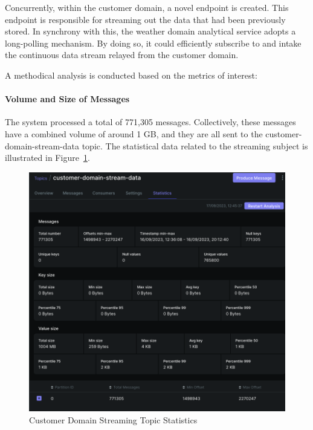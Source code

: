 \documentclass{ieeeaccess}
\begin{document}
Concurrently, within the customer domain, a novel endpoint is created. This endpoint is responsible for streaming out the data that had been previously stored. In synchrony with this, the weather domain analytical service adopts a long-polling mechanism. By doing so, it could efficiently subscribe to and intake the continuous data stream relayed from the customer domain.

A methodical analysis is conducted based on the metrics of interest:

\paragraph{Volume and Size of Messages} The system processed a total of 771,305 messages. Collectively, these messages have a combined volume of around 1 GB, and they are all sent to the customer-domain-stream-data topic. The statistical data related to the streaming subject is illustrated in Figure~\ref{customerDomainStreamingTopicStatistics}.

\begin{figure}

  \centering

  \includegraphics[width=\columnwidth]{images/customer-domain-stream-data-topic-statistics.png}

  \caption{Customer Domain Streaming Topic Statistics}

  \label{customerDomainStreamingTopicStatistics}

\end{figure}
\end{document}

